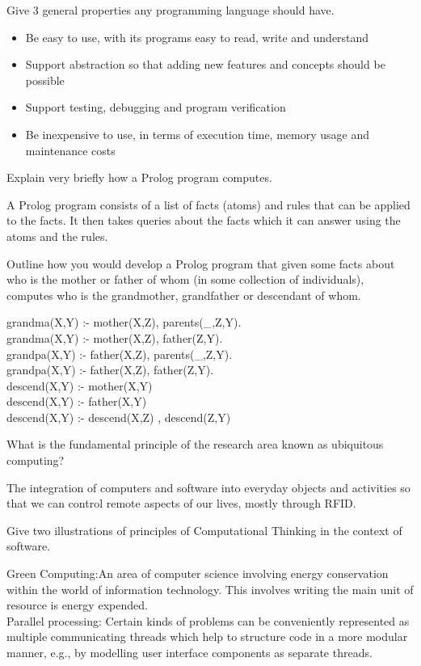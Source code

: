 \documentclass{exam}
\begin{document}
\begin{questions}
\question[3]Give 3 general properties any programming language should have.
\begin{solution}[2in]
\begin{itemize}
	\item Be easy to use, with its programs easy to read, write and understand
	\item Support abstraction so that adding new features and concepts should be possible
	\item Support testing, debugging and program verification
	\item Be inexpensive to use, in terms of execution time, memory usage and maintenance costs
\end{itemize}
\end{solution}

\question[4]Explain very briefly how a Prolog program computes.
\begin{solution}[2in]
A Prolog program consists of a list of facts (atoms) and rules that can be applied to the facts. It then takes queries about the facts which it can answer using the atoms and the rules.
\end{solution}

\question[8]Outline how you would develop a Prolog program that given some facts
about who is the mother or father of whom (in some collection of individuals),
computes who is the grandmother, grandfather or descendant
of whom.
\begin{solution}[2in]
grandma(X,Y) :- mother(X,Z), parents(\_,Z,Y).\\ 
grandma(X,Y) :- mother(X,Z), father(Z,Y).\\ 
grandpa(X,Y) :- father(X,Z), parents(\_,Z,Y). \\
grandpa(X,Y) :- father(X,Z), father(Z,Y). \\
descend(X,Y) :- mother(X,Y)\\
descend(X,Y) :- father(X,Y)\\
descend(X,Y) :- descend(X,Z) , descend(Z,Y)\\
\end{solution}

\question[2]What is the fundamental principle of the research area known as ubiquitous
computing?
\begin{solution}[2in]
The integration of computers and software into everyday objects and activities so that we can control remote aspects of our lives, mostly through RFID.
\end{solution}

\question[2]Give two illustrations of principles of Computational Thinking in the
context of software. 
\begin{solution}[2in]
	Green Computing:An area of computer science involving energy conservation within the world of information technology. This involves writing the main unit of resource is energy expended.\\
	Parallel processing: Certain kinds of problems can be conveniently represented as multiple communicating threads which help to structure code in a more modular manner, e.g., by modelling user interface components as separate threads.
\end{solution}


\end{questions}
\end{document}
